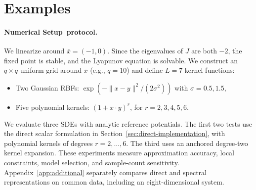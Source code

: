 \documentclass[11pt]{article}
\theoremstyle{plain}      %
\theoremstyle{definition} %
\providecommand{\DIFaddtex}[1]{{\protect\color{blue}#1}} %
\providecommand{\DIFdeltex}[1]{{\protect\color{red}#1}} %
\providecommand{\DIFaddbegin}{} %
\providecommand{\DIFaddend}{} %
\providecommand{\DIFdelbegin}{} %
\providecommand{\DIFdelend}{} %
\providecommand{\DIFadd}[1]{\texorpdfstring{\DIFaddtex{#1}}{#1}} %
\providecommand{\DIFdel}[1]{\texorpdfstring{\DIFdeltex{#1}}{}} %
\newcommand{\DIFscaledelfig}{1.0}
\newlength{\DIFdelgraphicswidth} %
\newlength{\DIFdelgraphicsheight} %
\newcommand{\DIFaddincludegraphics}[2][]{{\color{blue}\fbox{\DIFOincludegraphics[#1]{#2}}}} %
\newcommand{\DIFdelincludegraphics}[2][]{%
\sbox{\DIFdelgraphicsbox}{\DIFOincludegraphics[#1]{#2}}%
\settoboxwidth{\DIFdelgraphicswidth}{\DIFdelgraphicsbox} %
\settoboxtotalheight{\DIFdelgraphicsheight}{\DIFdelgraphicsbox} %
\scalebox{\DIFscaledelfig}{%
\parbox[b]{\DIFdelgraphicswidth}{\usebox{\DIFdelgraphicsbox}\\[-\baselineskip] \rule{\DIFdelgraphicswidth}{0em}}\llap{\resizebox{\DIFdelgraphicswidth}{\DIFdelgraphicsheight}{%
\setlength{\unitlength}{\DIFdelgraphicswidth}%
\begin{picture}(1,1)%
\thicklines\linethickness{2pt} %
{\color[rgb]{1,0,0}\put(0,0){\framebox(1,1){}}}%
{\color[rgb]{1,0,0}\put(0,0){\line( 1,1){1}}}%
{\color[rgb]{1,0,0}\put(0,1){\line(1,-1){1}}}%
\end{picture}%
}\hspace*{3pt}}} %
} %
\DeclareRobustCommand{\DIFaddbegin}{\DIFOaddbegin \let\includegraphics\DIFaddincludegraphics} %
\DeclareRobustCommand{\DIFaddend}{\DIFOaddend \let\includegraphics\DIFOincludegraphics} %
\DeclareRobustCommand{\DIFdelbegin}{\DIFOdelbegin \let\includegraphics\DIFdelincludegraphics} %
\DeclareRobustCommand{\DIFdelend}{\DIFOaddend \let\includegraphics\DIFOincludegraphics} %
\begin{document}
\DIFaddbegin \section{\DIFadd{Examples}}\label{examples}
\DIFaddend \paragraph{Numerical \DIFdelbegin \DIFdel{Setup}\DIFdelend\ \DIFaddbegin \DIFadd{protocol}\DIFaddend .}\par
\DIFdelbegin %
\DIFdel{We linearize around \( \bar x = (-1, 0) \). Since the eigenvalues of \( J \) are both \( -2 \), the fixed point is stable, and the Lyapunov equation is solvable. We construct an \( q \times q \) uniform grid around \( \bar{x} \) (e.g., \( q = 10 \)) and define \( L = 7 \) kernel functions:
}%
\begin{itemize}%
\item%
\DIFdel{Two Gaussian RBFs: \( \exp(-\|x - y\|^2 / (2\sigma^2)) \) with \( \sigma = 0.5, 1.5 \), }%
\item%
\DIFdel{Five polynomial kernels: \( (1 + x \cdot y)^r \), for \( r = 2, 3, 4, 5, 6 \).
}
\end{itemize}%
\DIFdelend \DIFaddbegin \label{sec:numerical-scope}
\DIFadd{We evaluate three SDEs with analytic reference potentials. The first two tests use the direct scalar formulation in Section~\ref{sec:direct-implementation}, with polynomial kernels of degrees $r=2,\ldots,6$. The third uses an anchored degree-two kernel expansion. These experiments measure approximation accuracy, local constraints, model selection, and sample-count sensitivity. Appendix~\ref{app:additional} separately compares direct and spectral representations on common data, including an eight-dimensional system.
}\DIFaddend 
\end{document}
